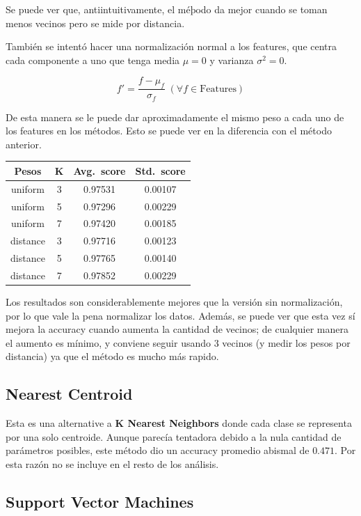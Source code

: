 \documentclass{article}
\begin{document}
Se puede ver que, antiintuitivamente, el méþodo da mejor cuando se toman menos vecinos pero se mide por distancia.

También se intentó hacer una normalización normal a los features, que centra cada componente a uno que tenga media \( \mu = 0 \) y varianza \( \sigma^2 = 0 \).

\[
	f' = \frac{f - \mu_f}{\sigma_f} \; (\forall f \in \text{Features})
\]

De esta manera se le puede dar aproximadamente el mismo peso a cada uno de los features en los métodos. Esto se puede ver en la diferencia con el método anterior.

\begin{center}
\begin{tabular}{c c c c}
	\toprule
	\textbf{Pesos} & \textbf{K} & \textbf{Avg.\ score} & \textbf{Std.\ score} \\
	\midrule
	uniform & 3 & 0.97531 & 0.00107 \\
	uniform & 5 & 0.97296 & 0.00229 \\
	uniform & 7 & 0.97420 & 0.00185 \\
	distance & 3 & 0.97716 & 0.00123 \\
	distance & 5 & 0.97765 & 0.00140 \\
	distance & 7 & 0.97852 & 0.00229 \\
	\bottomrule
\end{tabular}
\end{center}

Los resultados son considerablemente mejores que la versión sin normalización, por lo que vale la pena normalizar los datos. Además, se puede ver que esta vez sí mejora la accuracy cuando aumenta la cantidad de vecinos; de cualquier manera el aumento es mínimo, y conviene seguir usando 3 vecinos (y medir los pesos por distancia) ya que el método es mucho más rapido.

\subsection{Nearest Centroid}

Esta es una alternative a \textbf{K Nearest Neighbors} donde cada clase se representa por una solo centroide. Aunque parecía tentadora debido a la nula cantidad de parámetros posibles, este método dio un accuracy promedio abismal de \( 0.471 \). Por esta razón no se incluye en el resto de los análisis.

\subsection{Support Vector Machines}
\end{document}
